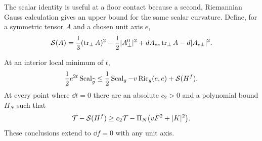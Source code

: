 The scalar identity is useful at a floor contact because a second,
Riemannian Gauss calculation gives an upper bound for the same scalar
curvature.  Define, for a symmetric tensor $A$ and a chosen unit axis $e$,
\begin{equation}\label{four:sys:gauss-quadratic}
 \mathcal S(A)=\frac13(\operatorname{tr}_\perp A)^2
       -\frac12|A_\perp^0|^2
       +d A_{ee}\operatorname{tr}_\perp A-d|A_{e\perp}|^2.
\end{equation}

\begin{lemma}\label{four:sys:gauss-lemma}
At an interior local minimum of $t$,
\begin{equation}\label{four:sys:gauss-bound}
 \frac12e^{2t}\operatorname{Scal}_{\widehat g}
 \le\frac12\operatorname{Scal}_g-v\operatorname{Ric}_g(e,e)+\mathcal S(H^f).
\end{equation}
At every point where $\dd t=0$ there are an absolute $c_2>0$ and a
polynomial bound $\Pi_N$ such that
\begin{equation}\label{four:sys:floor-coercivity}
 \mathcal T-\mathcal S(H^f)
          \ge c_2\mathcal T-\Pi_N\bigl(vF^2+|K|^2\bigr).
\end{equation}
These conclusions extend to $\dd f=0$ with any unit axis.
\end{lemma}


